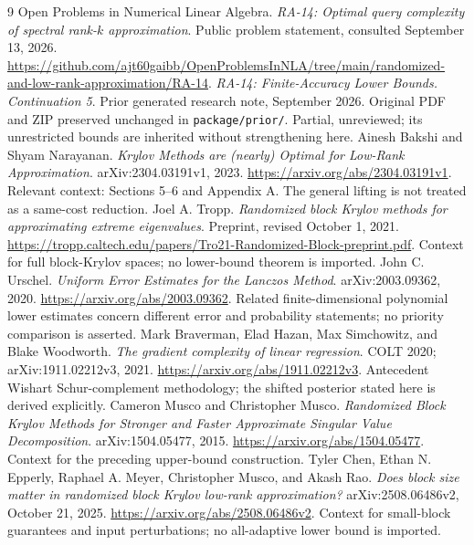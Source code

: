 \documentclass[11pt]{article}
\theoremstyle{definition}
\begin{document}
\begingroup\small\raggedright
\begin{thebibliography}{9}
 Open Problems in Numerical Linear Algebra. \emph{RA-14: Optimal query complexity of spectral rank-$k$ approximation}. Public problem statement, consulted September 13, 2026. \url{https://github.com/ajt60gaibb/OpenProblemsInNLA/tree/main/randomized-and-low-rank-approximation/RA-14}.
 \emph{RA-14: Finite-Accuracy Lower Bounds. Continuation 5}. Prior generated research note, September 2026. Original PDF and ZIP preserved unchanged in \texttt{package/prior/}. Partial, unreviewed; its unrestricted bounds are inherited without strengthening here.
 Ainesh Bakshi and Shyam Narayanan. \emph{Krylov Methods are (nearly) Optimal for Low-Rank Approximation}. arXiv:2304.03191v1, 2023. \url{https://arxiv.org/abs/2304.03191v1}. Relevant context: Sections 5--6 and Appendix A. The general lifting is not treated as a same-cost reduction.
 Joel A. Tropp. \emph{Randomized block Krylov methods for approximating extreme eigenvalues}. Preprint, revised October 1, 2021. \url{https://tropp.caltech.edu/papers/Tro21-Randomized-Block-preprint.pdf}. Context for full block-Krylov spaces; no lower-bound theorem is imported.
 John C. Urschel. \emph{Uniform Error Estimates for the Lanczos Method}. arXiv:2003.09362, 2020. \url{https://arxiv.org/abs/2003.09362}. Related finite-dimensional polynomial lower estimates concern different error and probability statements; no priority comparison is asserted.
 Mark Braverman, Elad Hazan, Max Simchowitz, and Blake Woodworth. \emph{The gradient complexity of linear regression}. COLT 2020; arXiv:1911.02212v3, 2021. \url{https://arxiv.org/abs/1911.02212v3}. Antecedent Wishart Schur-complement methodology; the shifted posterior stated here is derived explicitly.
 Cameron Musco and Christopher Musco. \emph{Randomized Block Krylov Methods for Stronger and Faster Approximate Singular Value Decomposition}. arXiv:1504.05477, 2015. \url{https://arxiv.org/abs/1504.05477}. Context for the preceding upper-bound construction.
 Tyler Chen, Ethan N. Epperly, Raphael A. Meyer, Christopher Musco, and Akash Rao. \emph{Does block size matter in randomized block Krylov low-rank approximation?} arXiv:2508.06486v2, October 21, 2025. \url{https://arxiv.org/abs/2508.06486v2}. Context for small-block guarantees and input perturbations; no all-adaptive lower bound is imported.
\end{thebibliography}
\endgroup
\end{document}
